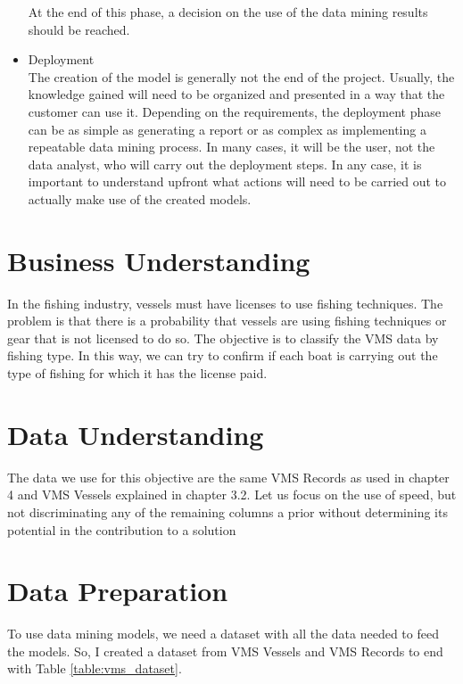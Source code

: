 \begin{itemize}
At the end of this phase, a decision on the use of the data mining results should be reached.
\item Deployment\\
The creation of the model is generally not the end of the project. Usually, the knowledge gained
will need to be organized and presented in a way that the customer can use it. Depending on
the requirements, the deployment phase can be as simple as generating a report or as complex
as implementing a repeatable data mining process. In many cases, it will be the user, not the
data analyst, who will carry out the deployment steps. In any case, it is important to
understand upfront what actions will need to be carried out to actually make use of
the created models.
\end{itemize}



\section{Business Understanding} %
\label{sub:business_understanding}

In the fishing industry, vessels must have licenses to use fishing techniques.
The problem is that there is a probability that vessels are using fishing techniques or gear that is not licensed to do so.
The objective is to classify the VMS data by fishing type. 
In this way, we can try to confirm if each boat is carrying out the type of fishing for which it has the license paid.





\section{Data Understanding} %
\label{sub:data_understanding}

The data we use for this objective are the same VMS Records as used in chapter 4 and VMS Vessels explained in chapter 3.2.
Let us focus on the use of speed, but not discriminating any of the remaining columns a prior without determining its potential in the contribution to a solution




\section{Data Preparation} %
\label{sub:data_preparation}
To use data mining models, we need a dataset with all the data needed to feed the models. So, I created a dataset from VMS Vessels and VMS Records to end with Table \ref{table:vms_dataset}. 

